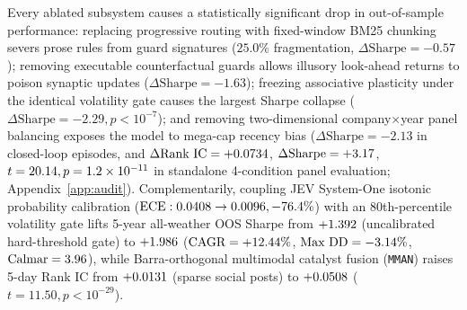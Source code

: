 Every ablated subsystem causes a statistically significant drop in out-of-sample performance:
replacing progressive routing with fixed-window BM25 chunking severs prose rules from guard
signatures ($25.0\%$ fragmentation, $\Delta\text{Sharpe} = -0.57$); removing executable
counterfactual guards allows illusory look-ahead returns to poison synaptic updates
($\Delta\text{Sharpe} = -1.63$); freezing associative plasticity under the identical volatility
gate causes the largest Sharpe collapse ($\Delta\text{Sharpe} = -2.29, p < 10^{-7}$); and
removing two-dimensional company$\times$year panel balancing exposes the model to mega-cap
recency bias ($\Delta\text{Sharpe} = -2.13$ in closed-loop episodes, and $\Delta\text{Rank IC} = +0.0734{}$,
$\Delta\text{Sharpe} = +3.17{}$, $t = 20.14{}, p = 1.2\times 10^{-11}{}$ in standalone
4-condition panel evaluation; Appendix~\ref{app:audit}). Complementarily, coupling JEV System-One
isotonic probability calibration ($\text{ECE}: 0.0408{} \to 0.0096{}, -76.4{}\%$)
with an 80th-percentile volatility gate lifts 5-year all-weather OOS Sharpe from $+1.392{}$
(uncalibrated hard-threshold gate) to $+1.986{}$ ($\text{CAGR} = +12.44{}\%$,
$\text{Max DD} = -3.14{}\%$, $\text{Calmar} = 3.96{}$), while Barra-orthogonal
multimodal catalyst fusion (\texttt{MMAN}) raises 5-day Rank IC from $+0.0131{}$
(sparse social posts) to $+0.0508{}$ ($t = 11.50, p < 10^{-29}$).

